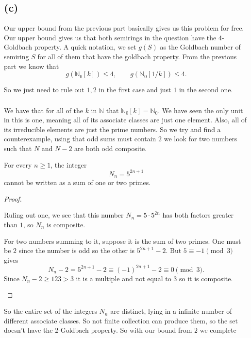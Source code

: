 \documentclass[11pt]{scrartcl}
\begin{document}
\subsection{(c)}

\begin{soln}
	Our upper bound from the previous part basically gives us this problem 
	for free. Our upper bound gives us that both semirings 
	in the question have the $4$-Goldbach property.
    A quick notation, we set $g(S)$ as the Goldbach number of semiring $S$ for
	all of them that have the goldbach property. 
	From the previous part we know that
    \[
    g(\mathbb N_0[k])\le4,
    \qquad
    g(\mathbb N_0[1/k])\le4.
    \]
  
	So we just need to rule out $1,2$ in the first case and just $1$ in the second one.


    \subsubsection*{}

    We have that for all of the $k$ in $\mathbb N$ that
    $\mathbb N_0[k]=\mathbb N_0$. We have seen the only unit in this
	is one, meaning all of its associate classes are just one element. Also,
	all of its irreducible elements are just the prime numbers. 
	So we try and find a counterexample, using that odd sums must contain $2$ we
    look for two numbers such that $N$ and $N-2$ are both odd composite.
        \begin{claim*}
        For every $n\ge1$, the integer
        \[
        N_n=5^{2n+1}
        \]
        cannot be written as a sum of one or two primes.
    \end{claim*}

    \begin{proof}
        \begin{subproof}
			Ruling out one, we see that this number $N_n=5\cdot5^{2n}$ has both
            factors greater than $1$, so $N_n$ is composite.
        \end{subproof}

        \begin{subproof}
			For two numbers summing to it, suppose it is
			the sum of two primes. 
            One must be $2$ since the number is odd so the other is $5^{2n+1}-2$. 
            But $5\equiv-1\pmod3$ gives
            \[
            N_n-2=5^{2n+1}-2
            \equiv(-1)^{2n+1}-2
            \equiv0\pmod3.
            \]
            Since $N_n-2\ge123>3$ it is a multiple and not equal to $3$ so it
			is composite.
        \end{subproof}
    \end{proof}
	So the entire set of the integers $N_n$ are distinct, lying in a infinite
	number of different associate classes. So not finite collection can produce them, 
	so the set doesn't have the $2$-Goldbach property.
    So with our bound from $2$ we complete


\end{soln}
\end{document}
